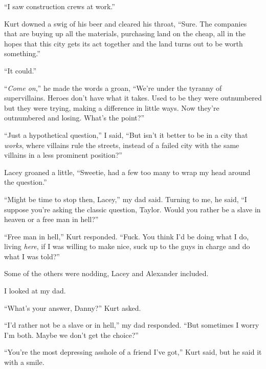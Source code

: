 ``I saw construction crews at work.''



Kurt downed a swig of his beer and cleared his throat, ``Sure.  The companies that are buying up all the materials, purchasing land on the cheap, all in the hopes that this city gets its act together and the land turns out to be worth something.''



``It could.''



``\emph{Come on},'' he made the words a groan, ``We're under the tyranny of supervillains.  Heroes don't have what it takes.  Used to be they were outnumbered but they were trying, making a difference in little ways.  Now they're outnumbered and losing.  What's the point?''



``Just a hypothetical question,'' I said, ``But isn't it better to be in a city that \emph{works}, where villains rule the streets, instead of a failed city with the same villains in a less prominent position?''



Lacey groaned a little, ``Sweetie, had a few too many to wrap my head around the question.''



``Might be time to stop then, Lacey,'' my dad said.  Turning to me, he said, ``I suppose you're asking the classic question, Taylor.  Would you rather be a slave in heaven or a free man in hell?''



``Free man in hell,'' Kurt responded.  ``Fuck.  You think I'd be doing what I do, living \emph{here}, if I was willing to make nice, suck up to the guys in charge and do what I was told?''



Some of the others were nodding, Lacey and Alexander included.



I looked at my dad.



``What's your answer, Danny?''  Kurt asked.



``I'd rather not be a slave or in hell,'' my dad responded.  ``But sometimes I worry I'm both.  Maybe we don't get the choice?''



``You're the most depressing asshole of a friend I've got,'' Kurt said, but he said it with a smile.



